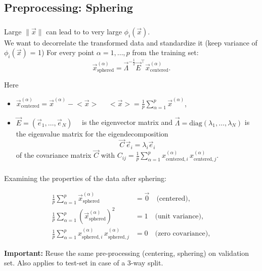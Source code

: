 \subsection{Preprocessing: Sphering}

\begin{frame}\frametitle{\subsecname}

Large $\lVert \vec x \rVert$ can lead to to very large $\phi_i(\vec x)$. \\

We want to decorrelate the transformed data and standardize it (keep variance of $\phi_i(\vec x)$ = 1)
For every point $\alpha=1,\ldots,p$ from the training set:
\begin{equation}
\vec x^{(\alpha)}_\mathrm{sphered} = \vec \Lambda^{-\frac{1}{2}} \vec E^\top \vec x^{(\alpha)}_\mathrm{centered}.
\end{equation}

Here 
\begin{itemize}
 \item[]   
$\vec x^{(\alpha)}_\mathrm{centered} = \vec x^{(\alpha)} - \big<{\vec x}\big>\quad$ 
$\big<{\vec x}\big> = \frac{1}{p} \sum_{\alpha=1}^p \vec x^{(\alpha)}$,
\item[] $\vec E = (\vec e_1, \dots, \vec e_N)\quad$ is the eigenvector matrix and $\vec \Lambda = \mathrm{diag}(\lambda_1, \dots, \lambda_N)$ is the eigenvalue matrix for the eigendecomposition 
$$
\vec C \, \vec e_i = \lambda_i \vec e_i
$$ of the covariance matrix $\vec C$ with $C_{ij} = \frac{1}{p} \sum_{\alpha=1}^p x^{(\alpha)}_{\mathrm{centered},i} \, x^{(\alpha)}_{\mathrm{centered},j}$.
\end{itemize}


\end{frame}

\begin{frame}\frametitle{\subsecname}

Examining the properties of the data after sphering:

\begin{align}
\frac{1}{p}  \sum_{\alpha=1}^{p} \vec x^{(\alpha)}_\mathrm{sphered} &= \vec 0 \quad \text{(centered)},\\
\frac{1}{p}  \sum_{\alpha=1}^{p} (\vec x^{(\alpha)}_\mathrm{sphered})^{2} &=  1 \quad \text{(unit variance)},\\
\frac{1}{p}  \sum_{\alpha=1}^{p} x^{(\alpha)}_{\mathrm{sphered},i} \, x^{(\alpha)}_{\mathrm{sphered},j} &= 0 \quad \text{(zero covariance)},
\end{align}

\textbf{Important:} Reuse the same pre-processing (centering, sphering) on validation set. 
Also applies to test-set in case of a 3-way split.

\end{frame}

